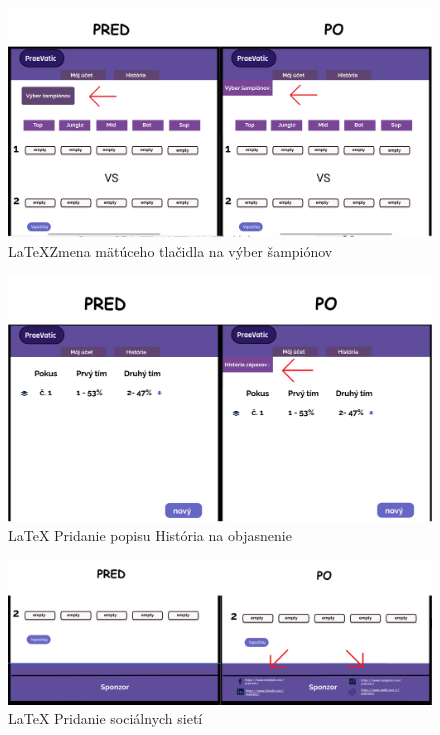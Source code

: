 \begin{figure}[h!]
	
	\includegraphics[width=.9\textwidth]{figures/2}
	
	\centering
	
	\caption{\LaTeX{}Zmena mätúceho tlačidla na výber šampiónov\label{2}}
	
\end{figure}



\begin{figure}[h!]
	
	\includegraphics[width=.9\textwidth]{figures/3}
	
	\centering
	
	\caption{\LaTeX{} Pridanie popisu História na objasnenie \label{3}}
	
\end{figure}



\begin{figure}[h!]
	
	\includegraphics[width=.9\textwidth]{figures/4}
	
	\centering
	
	\caption{\LaTeX{} Pridanie sociálnych sietí \label{4}}
	
\end{figure}





